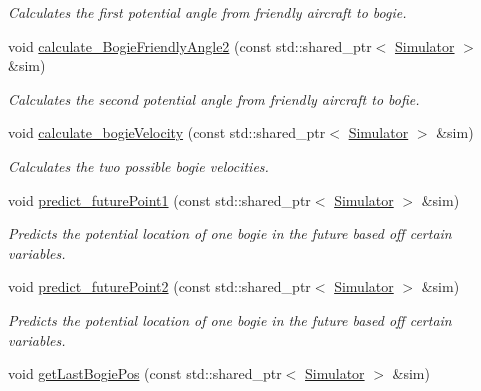 \begin{DoxyCompactItemize}
\begin{DoxyCompactList}\small\item\em Calculates the first potential angle from friendly aircraft to bogie. \end{DoxyCompactList}\item 
void \hyperlink{classControl_aa35d0eece2720a4e2277db45dd566d1d}{calculate\+\_\+\+Bogie\+Friendly\+Angle2} (const std\+::shared\+\_\+ptr$<$ \hyperlink{classSimulator}{Simulator} $>$ \&sim)\hypertarget{classControl_aa35d0eece2720a4e2277db45dd566d1d}{}\label{classControl_aa35d0eece2720a4e2277db45dd566d1d}

\begin{DoxyCompactList}\small\item\em Calculates the second potential angle from friendly aircraft to bofie. \end{DoxyCompactList}\item 
void \hyperlink{classControl_ae532ea9cee067466a5d4b83991e3c2fa}{calculate\+\_\+bogie\+Velocity} (const std\+::shared\+\_\+ptr$<$ \hyperlink{classSimulator}{Simulator} $>$ \&sim)\hypertarget{classControl_ae532ea9cee067466a5d4b83991e3c2fa}{}\label{classControl_ae532ea9cee067466a5d4b83991e3c2fa}

\begin{DoxyCompactList}\small\item\em Calculates the two possible bogie velocities. \end{DoxyCompactList}\item 
void \hyperlink{classControl_acd608be2fe30dd0bbc8134a7c1f56d63}{predict\+\_\+future\+Point1} (const std\+::shared\+\_\+ptr$<$ \hyperlink{classSimulator}{Simulator} $>$ \&sim)\hypertarget{classControl_acd608be2fe30dd0bbc8134a7c1f56d63}{}\label{classControl_acd608be2fe30dd0bbc8134a7c1f56d63}

\begin{DoxyCompactList}\small\item\em Predicts the potential location of one bogie in the future based off certain variables. \end{DoxyCompactList}\item 
void \hyperlink{classControl_a853c1b3bb981350826cfff100c119a09}{predict\+\_\+future\+Point2} (const std\+::shared\+\_\+ptr$<$ \hyperlink{classSimulator}{Simulator} $>$ \&sim)\hypertarget{classControl_a853c1b3bb981350826cfff100c119a09}{}\label{classControl_a853c1b3bb981350826cfff100c119a09}

\begin{DoxyCompactList}\small\item\em Predicts the potential location of one bogie in the future based off certain variables. \end{DoxyCompactList}\item 
void \hyperlink{classControl_a890695ac7e71616569ecf2daa29e7071}{get\+Last\+Bogie\+Pos} (const std\+::shared\+\_\+ptr$<$ \hyperlink{classSimulator}{Simulator} $>$ \&sim)\hypertarget{classControl_a890695ac7e71616569ecf2daa29e7071}{}\label{classControl_a890695ac7e71616569ecf2daa29e7071}


\end{DoxyCompactItemize}
